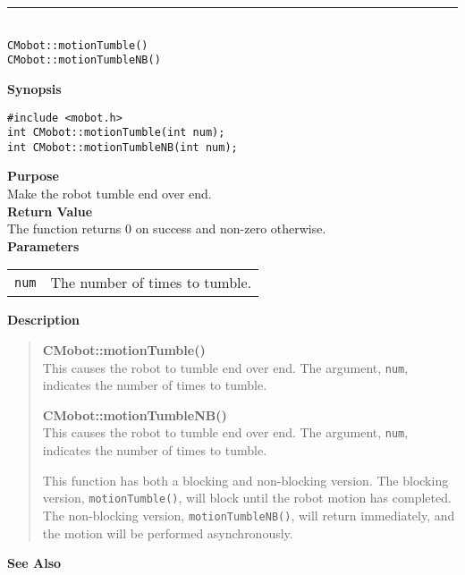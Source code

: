\noindent
\vspace{5pt}
\rule{4.5in}{0.015in}\\
\noindent
{\LARGE \texttt{CMobot::motionTumble()}}\\
{\LARGE \texttt{CMobot::motionTumbleNB()}}\\
{}

\noindent
{\bf Synopsis}
\vspace{-8pt}
\begin{verbatim}
#include <mobot.h>
int CMobot::motionTumble(int num);
int CMobot::motionTumbleNB(int num);
\end{verbatim}

\noindent
{\bf Purpose}\\
Make the robot tumble end over end.\\

\noindent
{\bf Return Value}\\
The function returns 0 on success and non-zero otherwise.\\

\noindent
{\bf Parameters}\\
\vspace{-0.1in}
\begin{description}
\item               
\begin{tabular}{p{10 mm}p{145 mm}}
\texttt{num} & The number of times to tumble. \\
\end{tabular}
\end{description}

\noindent
{\bf Description}\\
\vspace{-12pt}
\begin{quote}
{\bf CMobot::motionTumble()}\\
This causes the robot to tumble end over end. The argument, \texttt{num},
indicates the number of times to tumble.

{\bf CMobot::motionTumbleNB()}\\
This causes the robot to tumble end over end. The argument, \texttt{num},
indicates the number of times to tumble.

This function has both a blocking and non-blocking version.
The blocking version, \texttt{motionTumble()}, will block until the
robot motion has completed. The non-blocking version, \texttt{motionTumbleNB()},
will return immediately, and the motion will be performed asynchronously.\\
\end{quote}

\noindent
{\bf See Also}\\

